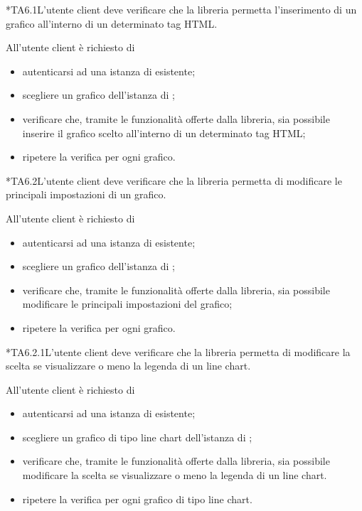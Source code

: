 	*{TA6.1}L'utente client deve verificare che la libreria permetta l'inserimento di un grafico all'interno di un determinato tag HTML.
		
		All'utente client è richiesto di
		\begin{itemize}
			\item autenticarsi ad una istanza di \projectname{} esistente;
			\item scegliere un grafico dell'istanza di \projectname{};
			\item verificare che, tramite le funzionalità offerte dalla libreria, sia possibile inserire il grafico scelto all'interno di un determinato tag HTML;
			\item ripetere la verifica per ogni grafico.
		\end{itemize}

	*{TA6.2}L'utente client deve verificare che la libreria permetta di modificare le principali impostazioni di un grafico.
		
		All'utente client è richiesto di
		\begin{itemize}
			\item autenticarsi ad una istanza di \projectname{} esistente;
			\item scegliere un grafico dell'istanza di \projectname{};
			\item verificare che, tramite le funzionalità offerte dalla libreria, sia possibile modificare le principali impostazioni del grafico;
			\item ripetere la verifica per ogni grafico.
		\end{itemize}

	*{TA6.2.1}L'utente client deve verificare che la libreria permetta di modificare la scelta se visualizzare o meno la legenda di un line chart.
		
		All'utente client è richiesto di
		\begin{itemize}
			\item autenticarsi ad una istanza di \projectname{} esistente;
			\item scegliere un grafico di tipo line chart dell'istanza di \projectname{};
			\item verificare che, tramite le funzionalità offerte dalla libreria, sia possibile modificare la scelta se visualizzare o meno la legenda di un line chart.
			\item ripetere la verifica per ogni grafico di tipo line chart.
		\end{itemize}

